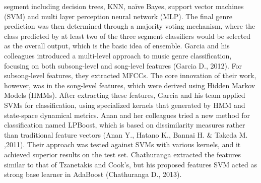segment including decision trees, KNN, naïve Bayes, support vector machines (SVM) and multi layer perception neural network (MLP). The final genre prediction was then determined through a majority voting mechanism, where the class predicted by at least two of the three segment classifiers would be selected as the overall output, which is the basic idea of ensemble. Garcia and his colleagues introduced a multi-level approach to music genre classification, focusing on both subsong-level and song-level features (Garcia D., 2012). For subsong-level features, they extracted MFCCs. The core innovation of their work, however, was in the song-level features, which were derived using Hidden Markov Models (HMMs). After extracting these features, Garcia and his team applied SVMs for classification, using specialized kernels that generated by HMM and state-space dynamical metrics. Anan and her colleagues tried a new method for classification named LPBoost, which is based on dissimilarity measures rather than traditional feature vectors (Anan Y., Hatano K., Bannai H. \& Takeda M. ,2011). Their approach was tested against SVMs with various kernels, and it achieved superior results on the test set. Chathuranga extracted the features similar to that of Tzanetakis and Cook's, but his proposed features SVM acted as strong base learner in AdaBoost (Chathuranga D., 2013).\\ 
\\
